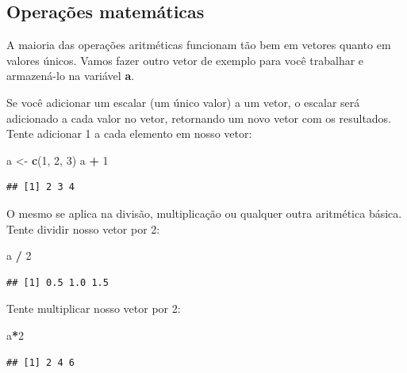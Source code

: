 \documentclass[
]{book}
\newenvironment{Shaded}{\begin{snugshade}}{\end{snugshade}}
\newcommand{\DecValTok}[1]{\textcolor[rgb]{0.00,0.00,0.81}{#1}}
\newcommand{\KeywordTok}[1]{\textcolor[rgb]{0.13,0.29,0.53}{\textbf{#1}}}
\newcommand{\NormalTok}[1]{#1}
\newcommand{\OperatorTok}[1]{\textcolor[rgb]{0.81,0.36,0.00}{\textbf{#1}}}
\newcommand{\StringTok}[1]{\textcolor[rgb]{0.31,0.60,0.02}{#1}}
\begin{document}
\hypertarget{operauxe7uxf5es-matemuxe1ticas}{%
\subsection{Operações matemáticas}\label{operauxe7uxf5es-matemuxe1ticas}}

A maioria das operações aritméticas funcionam tão bem em vetores quanto em valores únicos. Vamos fazer outro vetor de exemplo para você trabalhar e armazená-lo na variável \textbf{a}.

Se você adicionar um escalar (um único valor) a um vetor, o escalar será adicionado a cada valor no vetor, retornando um novo vetor com os resultados. Tente adicionar 1 a cada elemento em nosso vetor:

\begin{Shaded}
\begin{Highlighting}[]
\NormalTok{a <-}\StringTok{ }\KeywordTok{c}\NormalTok{(}\DecValTok{1}\NormalTok{, }\DecValTok{2}\NormalTok{, }\DecValTok{3}\NormalTok{)}
\NormalTok{a }\OperatorTok{+}\StringTok{ }\DecValTok{1}
\end{Highlighting}
\end{Shaded}

\begin{verbatim}
## [1] 2 3 4
\end{verbatim}

O mesmo se aplica na divisão, multiplicação ou qualquer outra aritmética básica. Tente dividir nosso vetor por 2:

\begin{Shaded}
\begin{Highlighting}[]
\NormalTok{a }\OperatorTok{/}\StringTok{ }\DecValTok{2}
\end{Highlighting}
\end{Shaded}

\begin{verbatim}
## [1] 0.5 1.0 1.5
\end{verbatim}

Tente multiplicar nosso vetor por 2:

\begin{Shaded}
\begin{Highlighting}[]
\NormalTok{a}\OperatorTok{*}\DecValTok{2}
\end{Highlighting}
\end{Shaded}

\begin{verbatim}
## [1] 2 4 6
\end{verbatim}
\end{document}
